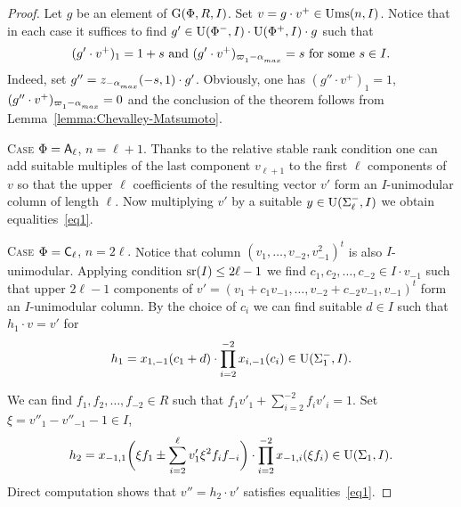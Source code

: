 \begin{proof}

Let $g$ be an element of $\operatorname{G}(\Phi, R, I)$. Set $v=g \cdot v^+\in\operatorname{Ums}(n, I)$. 
Notice that in each case it suffices to find $g' \in \operatorname{U}(\Phi^-, I) \cdot \operatorname{U}(\Phi^+, I) \cdot g$ such that 
\begin{equation} \label{eq1} (g'\cdot v^+)_{1} = 1 + s \text{ and } (g'\cdot v^+)_{\varpi\ssub{1}-\alpha\ssub{max}} = s\ \text{for some}\ s\in I. \end{equation}
Indeed, set $g'' = z_{-\alpha\ssub{max}}(-s, 1) \cdot g'$.
Obviously, one has $(g''\cdot v^+)_1 = 1$, $(g''\cdot v^+)_{\varpi\ssub{1}-\alpha\ssub{max}}=0$ and the conclusion of the theorem follows from Lemma~\ref{lemma:Chevalley-Matsumoto}.

\textsc{Case $\Phi=\mathsf{A}_\ell$, $n=\ell + 1$.}
Thanks to the relative stable rank condition one can add suitable multiples of the last component $v_{\ell+1}$ to the first $\ell$ components of $v$ so that the upper
$\ell$ coefficients of the resulting vector $v'$ form an $I$-unimodular column of length $\ell$.
Now multiplying $v'$ by a suitable $y\in \operatorname{U}(\Sigma_\ell^-, I)$ we obtain equalities~\ref{eq1}.

\textsc{Case $\Phi=\mathsf{C}_\ell$, $n=2\ell$.}
Notice that column $(v_1,\ldots, v_{-2}, v_{-1}^2)^t$ is also $I$-unimodular.
Applying condition $\operatorname{sr}(I)\leq 2\ell-1$ we find $c_1, c_2, \ldots, c_{-2} \in I \cdot v_{-1}$ such that upper $2\ell -1$ components of $v'=(v_1 + c_1 v_{-1}, \ldots, v_{-2} + c_{-2}v_{-1}, v_{-1})^t$ form an $I$-unimodular column.
By the choice of $c_i$ we can find suitable $d\in I$ such that $h_1 \cdot v = v'$ for
\[ h_1 = x_{1,-1}(c_1 + d) \cdot \prod_{i=2}^{-2} x_{i,-1}(c_i) \in \operatorname{U}(\Sigma_1^-, I). \]

We can find $f_1, f_2,\ldots, f_{-2} \in R$ such that $f_1v'_1+\sum_{i=2}^{-2} f_i v'_i = 1$.
Set $\xi = v''_1-v''_{-1}-1 \in I$,
\[ h_2 = x_{-1,1}\biggl(\xi f_1 \pm \sum_{i=2}^\ell v_1' \xi^2 f_i f_{-i}\biggr) \cdot \prod_{i=2}^{-2} x_{-1,i}(\xi f_i) \in \operatorname{U}(\Sigma_1, I). \]
Direct computation shows that $v'' = h_2 \cdot v'$ satisfies equalities~\ref{eq1}.



\end{proof}
